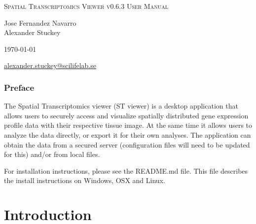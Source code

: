 \documentclass[10pt,a4paper,titlepage]{book}
\begin{document}
\begin{titlepage}
	\centering
	{\scshape\LARGE Spatial Transcriptomics Viewer v0.6.3 User Manual\par}
	\vspace{1cm}
	{\Large Jose Fernandez Navarro\\ Alexander Stuckey\par}
	\vspace{1cm}
	{\today\par}
	\vspace{1cm}
	\href{mailto:alexander.stuckey@scilifelab.se}{alexander.stuckey@scilifelab.se}

\end{titlepage}


\subsection*{Preface}
The Spatial Transcriptomics viewer (ST viewer) is a desktop application that allows users to securely access and visualize spatially distributed gene expression profile data with their respective tissue image. At the same time it allows users to analyze the data directly, or export it for their own analyses. The application can obtain the data from a secured server (configuration files will need to be updated for this) and/or from local files.


For installation instructions, please see the README.md file. This file describes the install instructions on Windows, OSX and Linux.


\tableofcontents
\raggedbottom
\clearpage
\listoffigures
{}

\chapter{Introduction}
\end{document}

